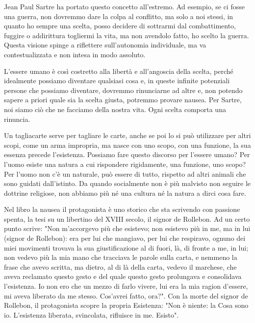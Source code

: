 \documentclass[12pt]{book} %
\begin{document}
Jean Paul Sartre ha portato questo concetto all'estremo. Ad esempio, se ci fosse una guerra, non dovremmo dare la colpa al conflitto, ma solo a noi stessi, in quanto ho sempre una scelta, posso decidere di sottrarmi dal combattimento, fuggire o addirittura togliermi la vita, ma non avendolo fatto, ho scelto la guerra. Questa visione spinge a riflettere sull’autonomia individuale, ma va contestualizzata e non intesa in modo assoluto.

L'essere umano è così costretto alla libertà e all'angoscia della scelta, perché idealmente possiamo diventare qualsiasi cosa e, in queste infinite potenziali persone che possiamo diventare, dovremmo rinunciarne ad altre e, non potendo sapere a priori quale sia la scelta giusta, potremmo provare nausea. Per Sartre, noi siamo ciò che ne facciamo della nostra vita. Ogni scelta comporta una rinuncia. 

Un tagliacarte serve per tagliare le carte, anche se poi lo si può utilizzare per altri scopi, come un arma impropria, ma nasce con uno scopo, con una funzione, la sua essenza precede l'esistenza. Possiamo fare questo discorso per l'essere umano? Per l'uomo esiste una natura a cui rispondere rigidamente, una funzione, uno scopo? Per l'uomo non c'è un naturale, può essere di tutto, rispetto ad altri animali che sono guidati dall'istinto. Da quando socialmente non è più malvisto non seguire le dottrine religiose, non abbiamo più né una cultura né la natura a dirci cosa fare.

Nel libro la nausea il protagonista è uno storico che sta scrivendo con passione spenta, la tesi su un libertino del XVIII secolo, il signor de Rollebon. Ad un certo punto scrive: "Non m'accorgevo più che esistevo; non esistevo più in me, ma in lui (signor de Rollebon): era per lui che mangiavo, per lui che respiravo, ognuno dei miei movimenti trovava la sua giustificazione al di fuori, là, di fronte a me, in lui; non vedevo più la mia mano che tracciava le parole sulla carta, e nemmeno la frase che avevo scritta, ma dietro, al di là della carta, vedevo il marchese, che aveva reclamato questo gesto e del quale questo gesto prolungava e consolidava l'esistenza. Io non ero che un mezzo di farlo vivere, lui era la mia ragion d'essere, mi aveva liberato da me stesso. Cos'avrei fatto, ora?". Con la morte del signor de Rollebon, il protagonista scopre la propria Esistenza: "Non è niente: la Cosa sono io. L'esistenza liberata, svincolata, rifluisce in me. Esisto". 
\end{document}
